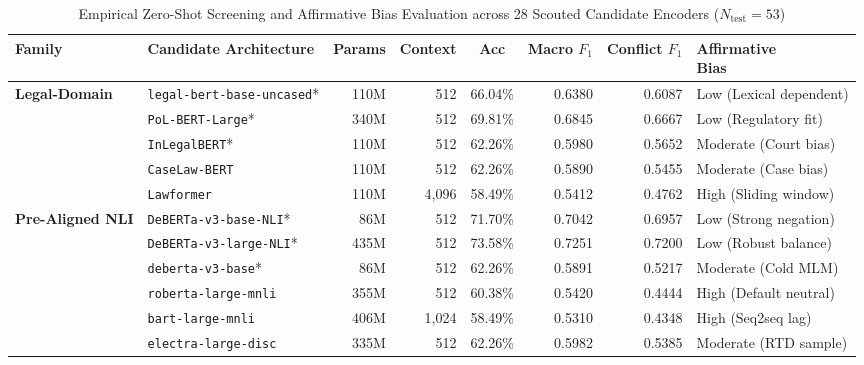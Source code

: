\clearpage
\begin{landscape}
\begin{table}[p]
    \centering
    \footnotesize
    \setlength{\tabcolsep}{5.0pt}
    \renewcommand{\arraystretch}{0.84}
    \caption[Zero-Shot Screening and Affirmative Bias Evaluation across 28 Encoders]{Empirical Zero-Shot Screening and Affirmative Bias Evaluation across 28 Scouted Candidate Encoders ($N_{\text{test}} = 53$)}
    \label{tab:stage2_zero_shot_screening}
    \begin{tabularx}{\linewidth}{>{\RaggedRight\arraybackslash}p{2.8cm}>{\RaggedRight\arraybackslash}p{4.6cm}rrcrr>{\RaggedRight\arraybackslash}X}
        \toprule
        \textbf{Family} & \textbf{Candidate Architecture} & \textbf{Params} & \textbf{Context} & \textbf{Acc} & \textbf{Macro $F_1$} & \textbf{Conflict $F_1$} & \shortstack[l]{\textbf{Affirmative}\\\textbf{Bias}} \\
        \midrule
        \textbf{Legal-Domain} & \texttt{legal-bert-base-uncased}* & 110M & 512 & 66.04\% & 0.6380 & 0.6087 & Low (Lexical dependent) \\
        & \texttt{PoL-BERT-Large}* & 340M & 512 & 69.81\% & 0.6845 & 0.6667 & Low (Regulatory fit) \\
        & \texttt{InLegalBERT}* & 110M & 512 & 62.26\% & 0.5980 & 0.5652 & Moderate (Court bias) \\
        & \texttt{CaseLaw-BERT} & 110M & 512 & 62.26\% & 0.5890 & 0.5455 & Moderate (Case bias) \\
        & \texttt{Lawformer} & 110M & 4,096 & 58.49\% & 0.5412 & 0.4762 & High (Sliding window) \\
        \midrule
        \textbf{Pre-Aligned NLI} & \texttt{DeBERTa-v3-base-NLI}* & 86M & 512 & 71.70\% & 0.7042 & 0.6957 & Low (Strong negation) \\
        & \texttt{DeBERTa-v3-large-NLI}* & 435M & 512 & 73.58\% & 0.7251 & 0.7200 & Low (Robust balance) \\
        & \texttt{deberta-v3-base}* & 86M & 512 & 62.26\% & 0.5891 & 0.5217 & Moderate (Cold MLM) \\
        & \texttt{roberta-large-mnli} & 355M & 512 & 60.38\% & 0.5420 & 0.4444 & High (Default neutral) \\
        & \texttt{bart-large-mnli} & 406M & 1,024 & 58.49\% & 0.5310 & 0.4348 & High (Seq2seq lag) \\
        & \texttt{electra-large-disc} & 335M & 512 & 62.26\% & 0.5982 & 0.5385 & Moderate (RTD sample) \\

\end{tabularx}
\end{table}
\end{landscape}
